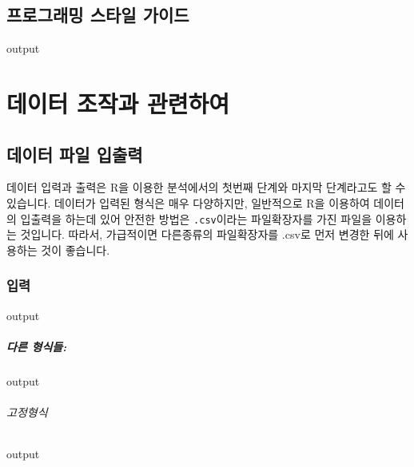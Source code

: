 \documentclass{report}
\begin{document}
	
\section{프로그래밍 스타일 가이드}
\begin{Schunk}
\begin{Soutput}
output
\end{Soutput}
\end{Schunk}

%
%
%

\chapter{데이터 조작과 관련하여}

\section{데이터 파일 입출력}

데이터 입력과 출력은 R을 이용한 분석에서의 첫번째 단계와 마지막 단계라고도 할 수 있습니다. 
데이터가 입력된 형식은 매우 다양하지만,  일반적으로 R을 이용하여 데이터의 입출력을 하는데 있어 안전한 방법은 \texttt{.csv}이라는 파일확장자를 가진 파일을 이용하는 것입니다.
따라서, 가급적이면 다른종류의 파일확장자를 .csv로 먼저 변경한 뒤에 사용하는 것이 좋습니다. 

\subsection{입력}
\begin{Schunk}
\begin{Soutput}
output
\end{Soutput}
\end{Schunk}

\paragraph{다른 형식들: }
\begin{Schunk}
\begin{Soutput}
output
\end{Soutput}
\end{Schunk}

\subparagraph{고정형식}
\begin{Schunk}
\begin{Soutput}
output
\end{Soutput}
\end{Schunk}
\end{document}

